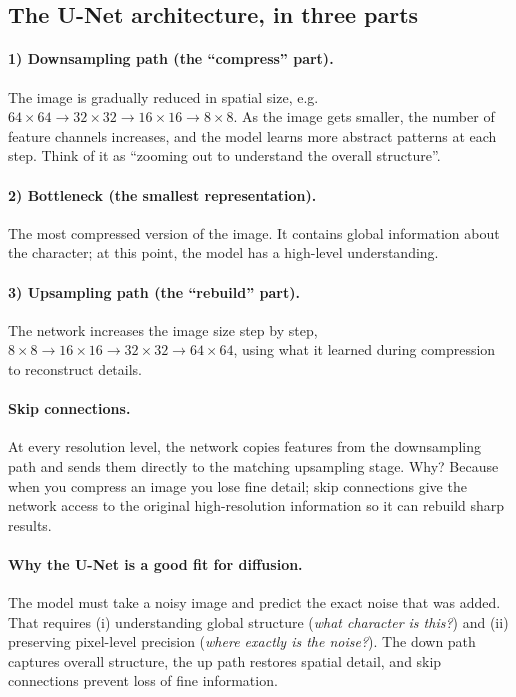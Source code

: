 \documentclass[11pt]{article}
\begin{document}
\subsection{The U-Net architecture, in three parts}

\paragraph{1) Downsampling path (the ``compress'' part).}
The image is gradually reduced in spatial size, e.g.\
$64{\times}64 \to 32{\times}32 \to 16{\times}16 \to 8{\times}8$. As the image
gets smaller, the number of feature channels increases, and the model learns
more abstract patterns at each step. Think of it as ``zooming out to
understand the overall structure''.

\paragraph{2) Bottleneck (the smallest representation).}
The most compressed version of the image. It contains global information
about the character; at this point, the model has a high-level understanding.

\paragraph{3) Upsampling path (the ``rebuild'' part).}
The network increases the image size step by step,
$8{\times}8 \to 16{\times}16 \to 32{\times}32 \to 64{\times}64$, using what it
learned during compression to reconstruct details.

\paragraph{Skip connections.}
At every resolution level, the network copies features from the downsampling
path and sends them directly to the matching upsampling stage. Why? Because
when you compress an image you lose fine detail; skip connections give the
network access to the original high-resolution information so it can rebuild
sharp results.

\paragraph{Why the U-Net is a good fit for diffusion.}
The model must take a noisy image and predict the exact noise that was added.
That requires (i) understanding global structure (\emph{what character is
this?}) and (ii) preserving pixel-level precision (\emph{where exactly is the
noise?}). The down path captures overall structure, the up path restores
spatial detail, and skip connections prevent loss of fine information.
\end{document}
